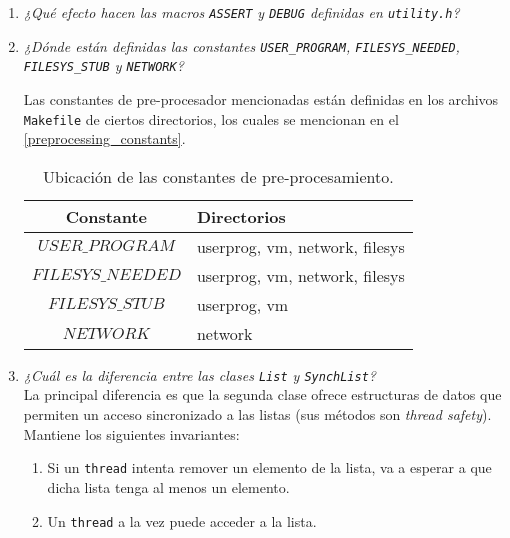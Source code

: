 \begin{enumerate}
\item \textit{¿Qué efecto hacen las macros \texttt{ASSERT} y \texttt{DEBUG} definidas en \texttt{utility.h}?}

\item \textit{¿Dónde están definidas las constantes \texttt{USER\_PROGRAM}, \texttt{FILESYS\_NEEDED}, \texttt{FILESYS\_STUB} y \texttt{NETWORK}?}

Las constantes de pre-procesador mencionadas están definidas en los archivos \texttt{Makefile} de ciertos directorios, los cuales se mencionan en el \autoref{preprocessing_constants}.

\begin{table}[hb]
	\center
    \begin{tabular}{|c|l|}
\hline 
Constante & Directorios\\
\hline
$USER\_PROGRAM$ & userprog, vm, network, filesys \\
$FILESYS\_NEEDED$ & userprog, vm, network, filesys \\
$FILESYS\_STUB$ & userprog, vm \\
$NETWORK$ & network \\
\hline
    \end{tabular}
    \caption{Ubicación de las constantes de pre-procesamiento.}
    \label{preprocessing_constants}
\end{table}


\item \textit{¿Cuál es la diferencia entre las clases \texttt{List} y \texttt{SynchList}?}\\
La principal diferencia es que la segunda clase ofrece estructuras de datos que permiten un acceso sincronizado a las listas (sus métodos son \textit{thread safety}). Mantiene los siguientes invariantes:
\begin{enumerate}
    \item Si un \texttt{thread} intenta remover un elemento de la lista, va a esperar a que dicha lista tenga al menos un elemento.
    \item Un \texttt{thread} a la vez puede acceder a la lista.
\end{enumerate}


\end{enumerate}
